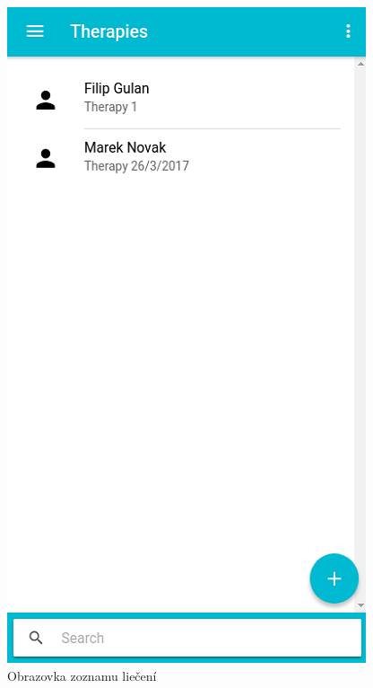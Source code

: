  \begin{figure}[h]
   \begin{minipage}{0.48\textwidth}
     \centering
     \includegraphics[scale=0.50]{fig/app1.png}
      \caption{Obrazovka zoznamu liečení}
      \label{fig:app1}
   \end{minipage}\hfill
   \begin {minipage}{0.48\textwidth}
     \centering

\end{minipage}
\end{figure}
